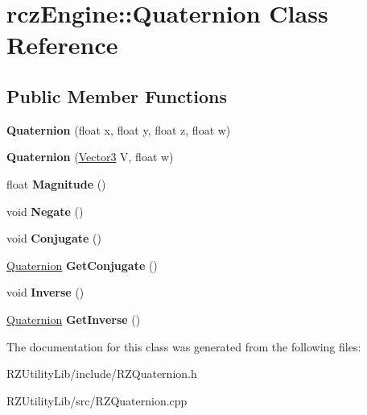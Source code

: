 \hypertarget{classrcz_engine_1_1_quaternion}{}\section{rcz\+Engine\+:\+:Quaternion Class Reference}
\label{classrcz_engine_1_1_quaternion}
\subsection*{Public Member Functions}
\begin{DoxyCompactItemize}
\item 
\hypertarget{classrcz_engine_1_1_quaternion_a6f12a0ea6193d44b82c26c634b252965}{}{\bfseries Quaternion} (float x, float y, float z, float w)\label{classrcz_engine_1_1_quaternion_a6f12a0ea6193d44b82c26c634b252965}

\item 
\hypertarget{classrcz_engine_1_1_quaternion_aba23cb764f8ea5704f3d8ade6d05925c}{}{\bfseries Quaternion} (\hyperlink{classrcz_engine_1_1_vector3}{Vector3} V, float w)\label{classrcz_engine_1_1_quaternion_aba23cb764f8ea5704f3d8ade6d05925c}

\item 
\hypertarget{classrcz_engine_1_1_quaternion_afe6f14dcb6b0a480aae116e4fe4caf8b}{}float {\bfseries Magnitude} ()\label{classrcz_engine_1_1_quaternion_afe6f14dcb6b0a480aae116e4fe4caf8b}

\item 
\hypertarget{classrcz_engine_1_1_quaternion_a10f8f5ab273b7e2acfb066a1fb3f4b8e}{}void {\bfseries Negate} ()\label{classrcz_engine_1_1_quaternion_a10f8f5ab273b7e2acfb066a1fb3f4b8e}

\item 
\hypertarget{classrcz_engine_1_1_quaternion_a3aec8924b768fd8a8e810ef8e392371a}{}void {\bfseries Conjugate} ()\label{classrcz_engine_1_1_quaternion_a3aec8924b768fd8a8e810ef8e392371a}

\item 
\hypertarget{classrcz_engine_1_1_quaternion_afc04e047d6616efddfe3fe281a12af3e}{}\hyperlink{classrcz_engine_1_1_quaternion}{Quaternion} {\bfseries Get\+Conjugate} ()\label{classrcz_engine_1_1_quaternion_afc04e047d6616efddfe3fe281a12af3e}

\item 
\hypertarget{classrcz_engine_1_1_quaternion_adcf706b4286c6d399b6c094d8efb37da}{}void {\bfseries Inverse} ()\label{classrcz_engine_1_1_quaternion_adcf706b4286c6d399b6c094d8efb37da}

\item 
\hypertarget{classrcz_engine_1_1_quaternion_a9d0681751a5a13a4e248acd6ef452b8a}{}\hyperlink{classrcz_engine_1_1_quaternion}{Quaternion} {\bfseries Get\+Inverse} ()\label{classrcz_engine_1_1_quaternion_a9d0681751a5a13a4e248acd6ef452b8a}

\end{DoxyCompactItemize}


The documentation for this class was generated from the following files\+:\begin{DoxyCompactItemize}
\item 
R\+Z\+Utility\+Lib/include/R\+Z\+Quaternion.\+h\item 
R\+Z\+Utility\+Lib/src/R\+Z\+Quaternion.\+cpp\end{DoxyCompactItemize}
